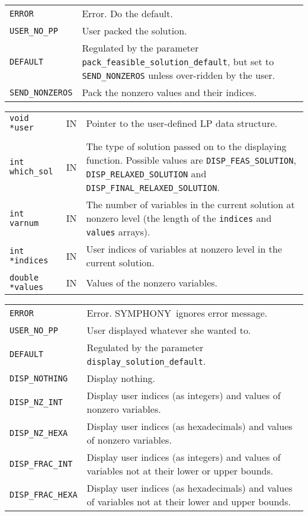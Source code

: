 \documentclass[twoside,11pt]{article}
\begin{document}
{\newpage
\clearpage
\samepage \begin{tabular}{lp{353.976pt}}
{\tt ERROR} & Error. Do the default.\\ 
{\tt USER\_NO\_PP} & User packed the solution.\\ 
{\tt DEFAULT} & Regulated by the parameter {\tt
pack\_feasible\_solution\_default}, but set to {\tt SEND\_NONZEROS}
unless over-ridden by the user.\\ 
{\tt SEND\_NONZEROS} & Pack the nonzero values and their indices.\\ 
\end{tabular}
}

{\newpage
\clearpage
\samepage \begin{tabular}{llp{301.645pt}}
{\tt void *user} & IN & Pointer to the user-defined LP data structure.\\ 
& & \\ 
{\tt int which\_sol} & IN & The type of solution passed on to the
displaying function. Possible values are {\tt DISP\_FEAS\_SOLUTION},
{\tt DISP\_RELAXED\_SOLUTION} and {\tt DISP\_FINAL\_RELAXED\_SOLUTION}. \\ 
{\tt int varnum} & IN & The number of variables in the current
solution at nonzero level (the length of the {\tt indices} and {\tt
values} arrays). \\ 
{\tt int *indices} & IN & User indices of variables at
nonzero level in the current solution.\\ 
{\tt double *values} & IN & Values of the nonzero variables.\\ 
\end{tabular}
}

{\newpage
\clearpage
\samepage \begin{tabular}{lp{350.196pt}}
{\tt ERROR} & Error. {\sc SYMPHONY}\ ignores error message. \\ 
{\tt USER\_NO\_PP} & User displayed whatever she wanted to.\\ 
{\tt DEFAULT} & Regulated by the parameter {\tt display\_solution\_default}. \\ 
{\tt DISP\_NOTHING} & Display nothing. \\ 
{\tt DISP\_NZ\_INT} & Display user indices (as integers) and values of
nonzero variables. \\ 
{\tt DISP\_NZ\_HEXA} & Display user indices (as hexadecimals) and
values of nonzero variables. \\ 
{\tt DISP\_FRAC\_INT} & Display user indices (as integers) and values
of variables not at their lower or upper bounds. \\ 
{\tt DISP\_FRAC\_HEXA} & Display user indices (as hexadecimals) and
values of variables not at their lower and upper bounds. \\ 
\end{tabular}
}
\end{document}

